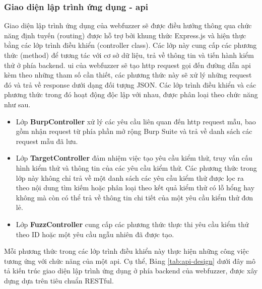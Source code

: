\subsubsection{Giao diện lập trình ứng dụng - \acrshort{api}}
Giao diện lập trình ứng dụng của webfuzzer sẽ được điều hướng thông qua chức năng định tuyến (routing) được hỗ trợ bởi khung thức Express.js và hiện thực bằng các lớp trình điều khiển (controller class). Các lớp này cung cấp các phương thức (method) để tương tác với cơ sở dữ liệu, trả về thông tin và tiến hành kiểm thử ở phía backend. \acrshort{ui} của webfuzzer sẽ tạo \acrshort{http} request gọi đến đường dẫn \acrshort{api} kèm theo những tham số cần thiết, các phương thức này sẽ xử lý những request đó và trả về response dưới dạng đối tượng JSON. Các lớp trình điều khiển và các phương thức trong đó hoạt động độc lập với nhau, được phân loại theo chức năng như sau.
\begin{itemize}
    \item Lớp \textbf{BurpController} xử lý các yêu cầu liên quan đến \acrshort{http} request mẫu, bao gồm nhận request từ phía phần mở rộng Burp Suite và trả về danh sách các request mẫu đã lưu.
    \item Lớp \textbf{TargetController} đảm nhiệm việc tạo yêu cầu kiểm thử, truy vấn cấu hình kiểm thử và thông tin của các yêu cầu kiểm thử. Các phương thức trong lớp này không chỉ trả về một danh sách các yêu cầu kiểm thử được lọc ra theo nội dung tìm kiếm hoặc phân loại theo kết quả kiểm thử có lỗ hổng hay không mà còn có thể trả về thông tin chi tiết của một yêu cầu kiểm thử đơn lẻ.
    \item Lớp \textbf{FuzzController} cung cấp các phương thức thực thi yêu cầu kiểm thử theo ID hoặc một yêu cầu ngẫu nhiên đã được tạo.
\end{itemize}
Mỗi phương thức trong các lớp trình điều khiển này thực hiện những công việc tương ứng với chức năng của một \acrshort{api}. Cụ thể, Bảng \ref{tab:api-design} dưới đây mô tả kiến trúc giao diện lập trình ứng dụng ở phía backend của webfuzzer, được xây dựng dựa trên tiêu chuẩn RESTful.
\FloatBarrier
